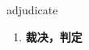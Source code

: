 
\begin{frame}
{\huge adjudicate}
\begin{center}
\begin{enumerate}\Large
  \item \textbf{裁决，判定}
\end{enumerate}
\end{center}
\end{frame}
